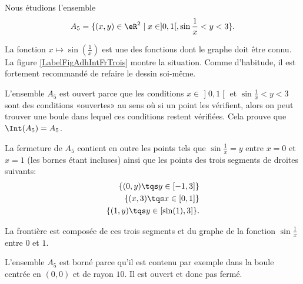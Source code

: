 \begin{example}
	Nous étudions l'ensemble
	\begin{equation}
		A_5 = \{ (x, y ) \in \eR^2 \; | \; x \in ]0, 1[, \sin \frac 1x < y < 3 \}.
	\end{equation}

	La fonction $x\mapsto\sin(\frac{1}{ x })$ est une des fonctions dont le graphe doit être connu. La figure \ref{LabelFigAdhIntFrTrois} montre la situation. Comme d'habitude, il est fortement recommandé de refaire le dessin soi-même.
	\newcommand{\CaptionFigAdhIntFrTrois}{Les points qui dont sur l'axe vertical entre $0$ et $3$ sont sur la frontière, mais pas dans l'ensemble $A_5$.}
	

	L'ensemble $A_5$ est ouvert parce que les conditions $x\in\mathopen] 0 , 1 \mathclose[$ et $\sin\frac{1}{ x }<y<3$ sont des conditions «ouvertes» au sens où si un point les vérifient, alors on peut trouver une boule dans lequel ces conditions restent vérifiées. Cela prouve que $\Int(A_5)=A_5$.

	La fermeture de $A_5$ contient en outre les points tels que $\sin\frac{1}{ x }=y$ entre $x=0$ et $x=1$ (les bornes étant incluses) ainsi que les points des trois segments de droites suivants:
	\begin{equation}
		\begin{aligned}[]
			\{ (0,y)\tqs y\in\mathopen[ -1 , 3 \mathclose] \} \\
			\{ (x,3)\tqs x\in\mathopen[ 0 , 1 \mathclose] \}  \\
			\{ (1,y)\tqs y\in\mathopen[ \sin(1) , 3 \mathclose] \}.
		\end{aligned}
	\end{equation}

	La frontière est composée de ces trois segments et du graphe de la fonction $\sin\frac{1}{ x }$ entre $0$ et $1$.

	L'ensemble $A_5$ est borné parce qu'il est contenu par exemple dans la boule centrée en $(0,0)$ et de rayon $10$. Il est ouvert et donc pas fermé.
\end{example}


